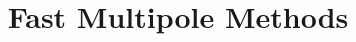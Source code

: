 \documentclass[english]{finalproject}
\title{Fast Multipole Methods}
\begin{document}
  \maketitle

  
  
  
  
  

  \clearpage
  
  
  \nocite{*}
\end{document}
